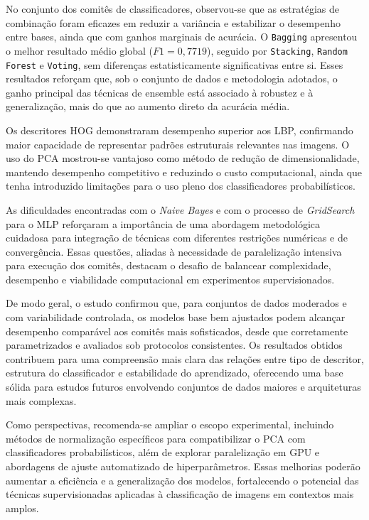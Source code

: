 \documentclass[12pt]{article}
\begin{document}
No conjunto dos comitês de classificadores, observou-se que as estratégias de combinação foram eficazes em reduzir a variância e estabilizar o desempenho entre bases, ainda que com ganhos marginais de acurácia.  
O \texttt{Bagging} apresentou o melhor resultado médio global (\(F1 = 0{,}7719\)), seguido por \texttt{Stacking}, \texttt{Random Forest} e \texttt{Voting}, sem diferenças estatisticamente significativas entre si.  
Esses resultados reforçam que, sob o conjunto de dados e metodologia adotados, o ganho principal das técnicas de ensemble está associado à robustez e à generalização, mais do que ao aumento direto da acurácia média.

Os descritores HOG demonstraram desempenho superior aos LBP, confirmando maior capacidade de representar padrões estruturais relevantes nas imagens.  
O uso do PCA mostrou-se vantajoso como método de redução de dimensionalidade, mantendo desempenho competitivo e reduzindo o custo computacional, ainda que tenha introduzido limitações para o uso pleno dos classificadores probabilísticos.  

As dificuldades encontradas com o \textit{Naive Bayes} e com o processo de \textit{GridSearch} para o MLP reforçaram a importância de uma abordagem metodológica cuidadosa para integração de técnicas com diferentes restrições numéricas e de convergência.  
Essas questões, aliadas à necessidade de paralelização intensiva para execução dos comitês, destacam o desafio de balancear complexidade, desempenho e viabilidade computacional em experimentos supervisionados.

De modo geral, o estudo confirmou que, para conjuntos de dados moderados e com variabilidade controlada, os modelos base bem ajustados podem alcançar desempenho comparável aos comitês mais sofisticados, desde que corretamente parametrizados e avaliados sob protocolos consistentes.  
Os resultados obtidos contribuem para uma compreensão mais clara das relações entre tipo de descritor, estrutura do classificador e estabilidade do aprendizado, oferecendo uma base sólida para estudos futuros envolvendo conjuntos de dados maiores e arquiteturas mais complexas.

Como perspectivas, recomenda-se ampliar o escopo experimental, incluindo métodos de normalização específicos para compatibilizar o PCA com classificadores probabilísticos, além de explorar paralelização em GPU e abordagens de ajuste automatizado de hiperparâmetros.  
Essas melhorias poderão aumentar a eficiência e a generalização dos modelos, fortalecendo o potencial das técnicas supervisionadas aplicadas à classificação de imagens em contextos mais amplos.
\end{document}
